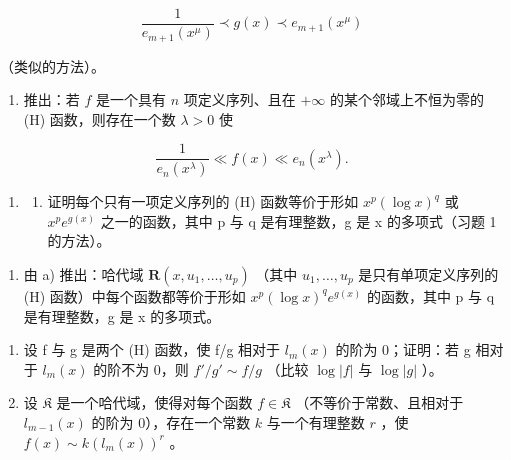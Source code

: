 \[
\frac {1}{e _ {m + 1} (x ^ {\mu})} \prec g (x) \prec e _ {m + 1} (x ^ {\mu})
\]

（类似的方法）。

\begin{enumerate}
\def\labelenumi{\alph{enumi})}
\setcounter{enumi}{2}
\tightlist
\item
  推出：若 \(f\) 是一个具有 \(n\) 项定义序列、且在 \(+\infty\) 的某个邻域上不恒为零的 (H) 函数，则存在一个数 \(\lambda > 0\) 使
\end{enumerate}

\[
\frac {1}{e _ {n} (x ^ {\lambda})} \ll f (x) \ll e _ {n} (x ^ {\lambda}).
\]

\begin{enumerate}
\def\labelenumi{\arabic{enumi})}
\setcounter{enumi}{1}
\tightlist
\item
  \begin{enumerate}
  \def\labelenumii{\alph{enumii})}
  \tightlist
  \item
    证明每个只有一项定义序列的 (H) 函数等价于形如 \(x^{p}(\log x)^{q}\) 或 \(x^{p}e^{g(x)}\) 之一的函数，其中 p 与 q 是有理整数，g 是 x 的多项式（习题 1 的方法）。
  \end{enumerate}
\end{enumerate}

\begin{enumerate}
\def\labelenumi{\alph{enumi})}
\setcounter{enumi}{1}
\tightlist
\item
  由 a) 推出：哈代域 \(\mathbf{R}(x,u_{1},\ldots,u_{p})\) （其中 \(u_{1},\ldots,u_{p}\) 是只有单项定义序列的 (H) 函数）中每个函数都等价于形如 \(x^{p}(\log x)^{q}e^{g(x)}\) 的函数，其中 p 与 q 是有理整数，g 是 x 的多项式。
\end{enumerate}

\begin{enumerate}
\def\labelenumi{\arabic{enumi})}
\setcounter{enumi}{2}
\item
  设 f 与 g 是两个 (H) 函数，使 f/g 相对于 \(l_{m}(x)\) 的阶为 0；证明：若 g 相对于 \(l_{m}(x)\) 的阶不为 0，则 \(f'/g' \sim f/g\) （比较 \(\log |f|\) 与 \(\log |g|\) ）。
\item
  设 \(\mathfrak{K}\) 是一个哈代域，使得对每个函数 \(f\in \mathfrak{K}\) （不等价于常数、且相对于 \(l_{m - 1}(x)\) 的阶为 0），存在一个常数 \(k\) 与一个有理整数 \(r\) ，使 \(f(x)\sim k(l_m(x))^r\) 。
\end{enumerate}

